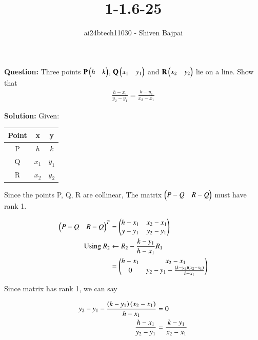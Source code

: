 \documentclass[journal]{IEEEtran}
\begin{document}
\onecolumn

\vspace{3cm}

\renewcommand{\thefigure}{\theenumi}
\renewcommand{\thetable}{\theenumi}

\title{1-1.6-25}
\author{ai24btech11030 - Shiven Bajpai}
\maketitle

\renewcommand{\thefigure}{\theenumi}
\renewcommand{\thetable}{\theenumi}

\textbf{Question: } Three points $\mathbf{P}\begin{pmatrix}h & k\end{pmatrix}$, $\mathbf{Q}\begin{pmatrix}x_1 & y_1\end{pmatrix}$ and $\mathbf{R}\begin{pmatrix}x_2 & y_2\end{pmatrix}$ lie on a line. Show that \begin{align*}\frac{h-x_1}{y_2-y_1} = \frac{k - y_1}{x_2 - x_1}\end{align*}

\textbf{Solution: } Given:
\begin{center}
\begin{tabular}{| c | c | c |}
    \hline
    \textbf{Point} & \textbf{x} & \textbf{y}\\
    \hline
    P & $h$ & $k$\\
    \hline
    Q & $x_1$ & $y_1$\\
    \hline
    R & $x_2$ & $y_2$\\
    \hline
\end{tabular}
\end{center}
    
Since the points P, Q, R are collinear, The matrix $\begin{pmatrix}P-Q & R-Q\end{pmatrix}$ must have rank 1.

\begin{align*}
    \begin{pmatrix}P-Q & R-Q\end{pmatrix}^T &= \begin{pmatrix}h-x_1 & x_2 - x_1 \\ y-y_1 & y_2-y_1\end{pmatrix}\\
    \text{Using  } R_2 &\leftarrow R_2 - \frac{k-y_1}{h-x_1}R_1\\
    &= \begin{pmatrix}h-x_1 & x_2 - x_1 \\ 0 & y_2-y_1 -\frac{\left(k-y_1\right)\left({x_2 - x_1}\right)}{h-x_1}\end{pmatrix}
\end{align*}

Since matrix has rank 1, we can say

\begin{align*}
    y_2-y_1 -\frac{\left(k-y_1\right)\left({x_2 - x_1}\right)}{h-x_1} &= 0\\
    \frac{h-x_1}{y_2-y_1} &= \frac{k - y_1}{x_2 - x_1}
\end{align*}
\end{document}

